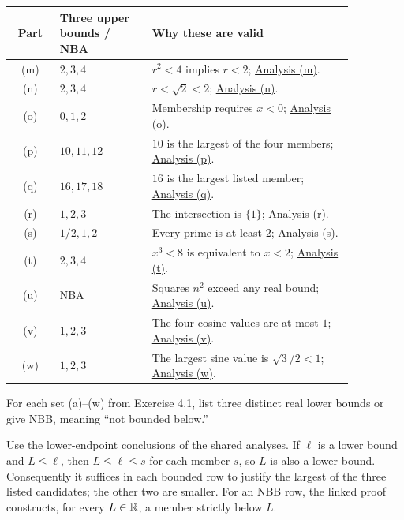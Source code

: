 \begin{center}
\begin{tabular}{@{}c@{\quad}p{0.27\linewidth}@{\quad}p{0.59\linewidth}@{}}
\toprule
Part&Three upper bounds / NBA&Why these are valid\\ \midrule
(m)&$2,3,4$&$r^2<4$ implies $r<2$; \hyperref[bounds:m]{Analysis (m)}.\\
(n)&$2,3,4$&$r<\sqrt2<2$; \hyperref[bounds:n]{Analysis (n)}.\\
(o)&$0,1,2$&Membership requires $x<0$; \hyperref[bounds:o]{Analysis (o)}.\\
(p)&$10,11,12$&$10$ is the largest of the four members; \hyperref[bounds:p]{Analysis (p)}.\\
(q)&$16,17,18$&$16$ is the largest listed member; \hyperref[bounds:q]{Analysis (q)}.\\
(r)&$1,2,3$&The intersection is $\{1\}$; \hyperref[bounds:r]{Analysis (r)}.\\
(s)&$1/2,1,2$&Every prime is at least $2$; \hyperref[bounds:s]{Analysis (s)}.\\
(t)&$2,3,4$&$x^3<8$ is equivalent to $x<2$; \hyperref[bounds:t]{Analysis (t)}.\\
(u)&NBA&Squares $n^2$ exceed any real bound; \hyperref[bounds:u]{Analysis (u)}.\\
(v)&$1,2,3$&The four cosine values are at most $1$; \hyperref[bounds:v]{Analysis (v)}.\\
(w)&$1,2,3$&The largest sine value is $\sqrt3/2<1$; \hyperref[bounds:w]{Analysis (w)}.\\
\bottomrule
\end{tabular}
\end{center}



\goal For each set (a)--(w) from Exercise 4.1, list three distinct
real lower bounds or give NBB, meaning ``not bounded below.''

\idea Use the lower-endpoint conclusions of the shared analyses.
If $\ell$ is a lower bound and $L\leq\ell$, then
$L\leq\ell\leq s$ for each member $s$, so $L$ is also a lower
bound. Consequently it suffices in each bounded row to justify the
largest of the three listed candidates; the other two are smaller.
For an NBB row, the linked proof constructs, for every $L\in\mathbb{R}$,
a member strictly below $L$.

